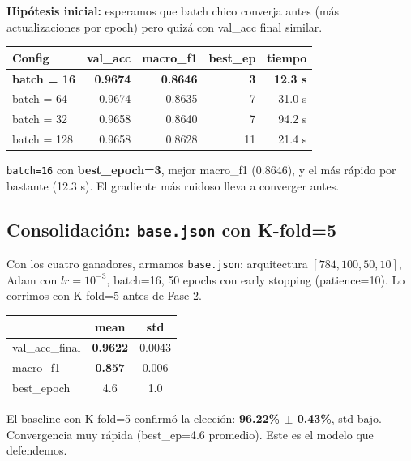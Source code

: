 \documentclass[11pt,a4paper]{article}
\newcommand{\code}[1]{\texttt{\textcolor{accent}{#1}}}
\newcommand{\winner}[1]{\cellcolor{accent2!15}\textbf{#1}}
\begin{document}
\textbf{Hipótesis inicial:} esperamos que batch chico converja antes (más actualizaciones por epoch) pero quizá con val\_acc final similar.

\begin{center}
\small
\begin{tabular}{@{}lrrrr@{}}
\toprule
\textbf{Config} & \textbf{val\_acc} & \textbf{macro\_f1} & \textbf{best\_ep} & \textbf{tiempo} \\
\midrule
\winner{batch = 16}    & \winner{0.9674} & \winner{0.8646} & \winner{3}  & \winner{12.3 s} \\
batch = 64             & 0.9674 & 0.8635 & 7  & 31.0 s \\
batch = 32             & 0.9658 & 0.8640 & 7  & 94.2 s \\
batch = 128            & 0.9658 & 0.8628 & 11 & 21.4 s \\
\bottomrule
\end{tabular}
\end{center}

\begin{decidimos}
\texttt{batch=16} con \textbf{best\_epoch=3}, mejor macro\_f1 (0.8646), y el más rápido por bastante (12.3 s). El gradiente más ruidoso lleva a converger antes.
\end{decidimos}

\subsection{Consolidación: \texttt{base.json} con K-fold=5}

Con los cuatro ganadores, armamos \code{base.json}: arquitectura $[784,100,50,10]$, Adam con $lr=10^{-3}$, batch=16, 50 epochs con early stopping (patience=10). Lo corrimos con K-fold=5 antes de Fase 2.

\begin{center}
\small
\begin{tabular}{@{}lcc@{}}
\toprule
& \textbf{mean} & \textbf{std} \\
\midrule
val\_acc\_final  & \textbf{0.9622} & 0.0043 \\
macro\_f1        & \textbf{0.857}  & 0.006 \\
best\_epoch      & 4.6   & 1.0 \\
\bottomrule
\end{tabular}
\end{center}

\begin{aprendimos}
El baseline con K-fold=5 confirmó la elección: \textbf{96.22\% $\pm$ 0.43\%}, std bajo. Convergencia muy rápida (best\_ep=4.6 promedio). Este es el modelo que defendemos.
\end{aprendimos}
\end{document}
